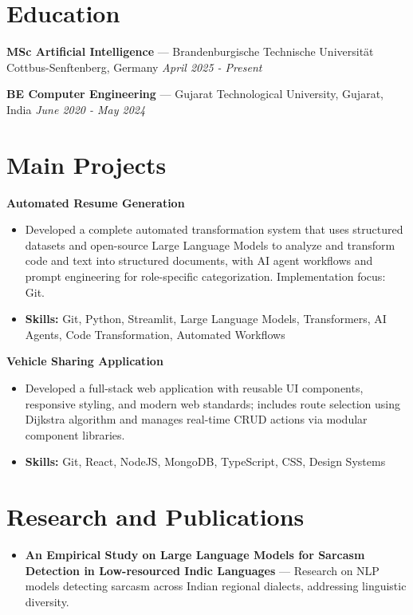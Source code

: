\documentclass[a4paper,10pt]{article}
\begin{document}
\section*{Education}
\textbf{MSc Artificial Intelligence} — Brandenburgische Technische Universität Cottbus-Senftenberg, Germany \hfill \textit{April 2025 - Present}\par
\vspace{1.5pt}
\textbf{BE Computer Engineering} — Gujarat Technological University, Gujarat, India \hfill \textit{June 2020 - May 2024}\par

\section*{Main Projects}
\textbf{Automated Resume Generation}\par
\vspace{1pt}
\begin{itemize}
  \item Developed a complete automated transformation system that uses structured datasets and open-source Large Language Models to analyze and transform code and text into structured documents, with AI agent workflows and prompt engineering for role-specific categorization. Implementation focus: Git.
  \item \textbf{Skills:} Git, Python, Streamlit, Large Language Models, Transformers, AI Agents, Code Transformation, Automated Workflows
\end{itemize}
\vspace{3pt}
\textbf{Vehicle Sharing Application}\par
\vspace{1pt}
\begin{itemize}
  \item Developed a full-stack web application with reusable UI components, responsive styling, and modern web standards; includes route selection using Dijkstra algorithm and manages real-time CRUD actions via modular component libraries.
  \item \textbf{Skills:} Git, React, NodeJS, MongoDB, TypeScript, CSS, Design Systems
\end{itemize}

\section*{Research and Publications}
\begin{itemize}
\item \textbf{An Empirical Study on Large Language Models for Sarcasm Detection in Low-resourced Indic Languages} — Research on NLP models detecting sarcasm across Indian regional dialects, addressing linguistic diversity.
\end{itemize}
\end{document}
